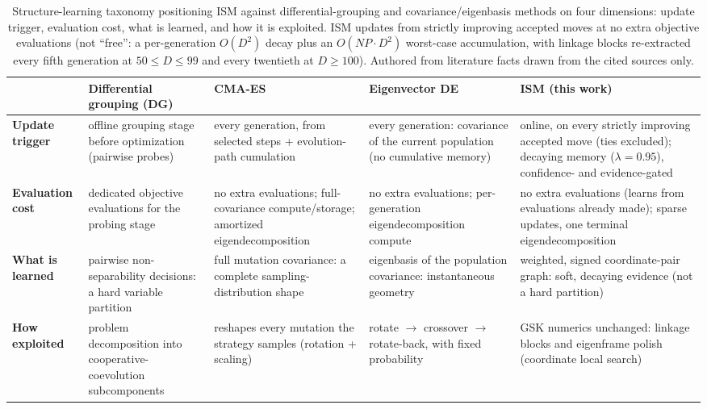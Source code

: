 \begin{table}[H]
\caption{Structure-learning taxonomy positioning ISM against
differential-grouping and covariance/eigenbasis methods on four
dimensions: update trigger, evaluation cost, what is learned, and how it
is exploited. ISM updates from strictly improving accepted moves at no extra objective
evaluations (not ``free'': a per-generation $O(D^{2})$ decay plus an
$O(\mathit{NP} \cdot D^{2})$ worst-case accumulation, with linkage blocks
re-extracted every fifth generation at $50 \le D \le 99$ and every
twentieth at $D \ge 100$). Authored from literature facts drawn from the cited sources
only.}
\label{tab:taxonomy}
\centering
\scriptsize
\zebra
\begin{tabular}{p{1.45cm}p{2.85cm}p{2.85cm}p{2.85cm}p{2.85cm}}
\toprule
& \textbf{Differential grouping (DG)} & \textbf{CMA-ES} & \textbf{Eigenvector DE} & \textbf{ISM (this work)} \\
\midrule
\textbf{Update trigger} & offline grouping stage before optimization (pairwise probes) & every generation, from selected steps + evolution-path cumulation & every generation: covariance of the current population (no cumulative memory) & online, on every strictly improving accepted move (ties excluded); decaying memory ($\lambda{=}0.95$), confidence- and evidence-gated \\
\textbf{Evaluation cost} & dedicated objective evaluations for the probing stage & no extra evaluations; full-covariance compute/storage; amortized eigendecomposition & no extra evaluations; per-generation eigendecomposition compute & no extra evaluations (learns from evaluations already made); sparse updates, one terminal eigendecomposition \\
\textbf{What is learned} & pairwise non-separability decisions: a hard variable partition & full mutation covariance: a complete sampling-distribution shape & eigenbasis of the population covariance: instantaneous geometry & weighted, signed coordinate-pair graph: soft, decaying evidence (not a hard partition) \\
\textbf{How exploited} & problem decomposition into cooperative-\allowbreak{}coevolution subcomponents & reshapes every mutation the strategy samples (rotation + scaling) & rotate $\to$ crossover $\to$ rotate-back, with fixed probability & GSK numerics unchanged: linkage blocks and eigenframe polish (coordinate local search) \\
\bottomrule
\end{tabular}
\end{table}

